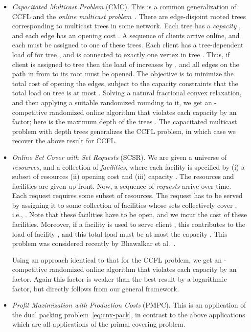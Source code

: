 \documentclass[letterpaper,11pt]{article}
\begin{document}
\begin{itemize}
\item {\em Capacitated Multicast Problem} (CMC).  This is a common
  generalization of CCFL and the \emph{online multicast
    problem}~\cite{AAABN-talg06}. There are  edge-disjoint rooted
  trees  corresponding to multicast trees in some
  network. Each tree  has a {\em capacity} , and each edge
   has an opening cost . A sequence of 
  clients arrive online, and each must be assigned to one of these
  trees. Each client  has a tree-dependent load of  for tree
  , and is connected to exactly one vertex  in tree
  . Thus, if client  is assigned to tree  then the load of
   increases by , and all edges on the path in  from
   to its root must be opened. The objective is to minimize
  the total cost of opening the edges, subject to the capacity
  constraints that the total load on tree  is at most .
  Solving a natural fractional convex relaxation, and then applying a
  suitable randomized rounding to it, we get an -competitive randomized online algorithm that violates each
  capacity by an  factor; here  is the maximum
  depth of the trees . The capacitated multicast
  problem with depth  trees generalizes the CCFL problem, in which
  case we recover the above result for CCFL.

\item {\em Online Set Cover with Set Requests} (SCSR).  We are given a
  universe  of  \emph{resources}, and a collection of 
  \emph{facilities}, where each facility  is specified by (i) a
  subset  of resources (ii) opening cost  and (iii)
  capacity . The resources and facilities are given up-front. Now,
  a sequence of  {\em requests} arrive over time. Each request
   requires some subset  of resources. The request
  has to be served by assigning it to some collection  of
  facilities whose sets collectively cover , i.e., . Note that these facilities have to be open, and
  we incur the cost of these facilities. Moreover, if a facility  is
  used to serve client , this contributes to the load of facility
  , and this total load must be at most the capacity .  This
  problem was considered recently by Bhawalkar et al.~\cite{BGP14}.

  Using an approach identical to that for the CCFL problem, we get an
  -competitive randomized online algorithm that
  violates each capacity by an  factor. Again this
  factor is weaker than the best result by a logarithmic factor, but
  directly follows from our general framework.

\item {\em Profit Maximization with Production Costs} (PMPC).
This is an application of the dual packing problem~\eqref{eq:cnx-pack}, in contrast to the above applications which are all applications of the primal covering problem.


\end{itemize}
\end{document}
